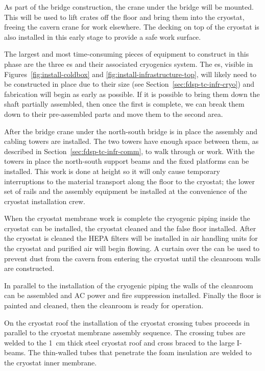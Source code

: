 As part of the bridge construction, the crane under the bridge will be mounted. This 
will be used to lift crates off the floor and bring them into the cryostat, freeing the cavern crane for work elsewhere. The decking on top of the cryostat is also installed in this early stage to provide a safe work surface. 

The largest and most time-consuming pieces of equipment to  construct in this phase are the three \coldbox{}es and their associated cryogenics system. 
The \coldbox{}es, visible in Figures~\ref{fig:install-coldbox} and \ref{fig:install-infrastructure-top}, will likely need to be constructed in place due to their size (see Section~\ref{sec:fdsp-tc-infr-cryo}) and fabrication will begin as early as possible.  
If it is possible to bring them down the shaft partially assembled, then once the first  is complete, we can break them down to their pre-assembled parts and move them to the second  area.

 
After the bridge crane under the north-south bridge is in place the  assembly and cabling towers are installed. 
The two towers have enough space between them, as described in Section~\ref{sec:fdsp-tc-infr-comm}, to walk through or work. 
With the towers in place the north-south support beams and the fixed platforms can be installed. 
This work is done at height so it will only cause temporary interruptions to the material transport along the floor to the cryostat; the lower set of rails and the  assembly equipment be installed at the convenience of the cryostat installation crew.

When the cryostat membrane work is complete the cryogenic piping inside the cryostat can be installed, the cryostat cleaned and the false floor installed. After the cryostat is cleaned the HEPA filters will be installed in air handling units for the cryostat and purified air will begin flowing. A curtain over the  can be used to prevent dust from the cavern from entering the cryostat until the cleanroom walls are constructed.

In parallel to the installation of the cryogenic piping the walls of the cleanroom can be assembled and AC power and fire suppression installed. Finally the floor is painted and 
cleaned, then the cleanroom is ready for operation.



On the cryostat roof the installation of the cryostat crossing tubes proceeds in parallel to the cryostat membrane assembly sequence.   
The crossing tubes are welded to the \SI{1}{cm} thick steel cryostat roof and cross braced to the large I-beams. 
The thin-walled tubes that penetrate the foam insulation are welded to the cryostat inner membrane.


